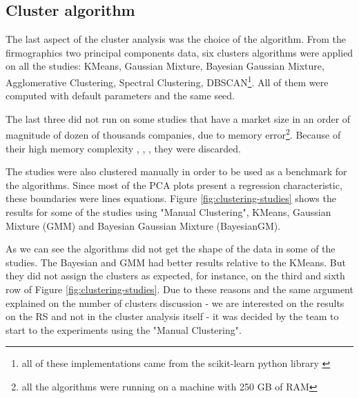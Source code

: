 \subsection{Cluster algorithm}
\label{ch:cluster-algorithm}

The last aspect of the cluster analysis was the choice of the algorithm. From the firmographics two principal components data, six clusters algorithms were applied on all the studies: KMeans, Gaussian Mixture, Bayesian Gaussian Mixture, Agglomerative Clustering, Spectral Clustering, DBSCAN\footnote{all of these implementations came from the scikit-learn python library \cite{scikit-learn}}. All of them were computed with default parameters and the same seed.

The last three did not run on some studies that have a market size in an order of magnitude of dozen of thousands companies, due to memory error\footnote{all the algorithms were running on a machine with 250 GB of RAM}. Because of their high memory complexity \cite{franti2006fast}, \cite{ester1996density}, \cite{yan2009fast}, they were discarded.

The studies were also clustered manually in order to be used as a benchmark for the algorithms. Since most of the PCA plots present a regression characteristic, these boundaries were lines equations. Figure \ref{fig:clustering-studies} shows the results for some of the studies using "Manual Clustering", KMeans, Gaussian Mixture (GMM) and Bayesian Gaussian Mixture (BayesianGM).

As we can see the algorithms did not get the shape of the data in some of the studies. The Bayesian and GMM had better results relative to the KMeans. But they did not assign the clusters as expected, for instance, on the third and sixth row of Figure \ref{fig:clustering-studies}. Due to these reasons and the same argument explained on the number of clusters discussion - we are interested on the results on the RS and not in the cluster analysis itself - it was decided by the team to start to the experiments using the "Manual Clustering".


